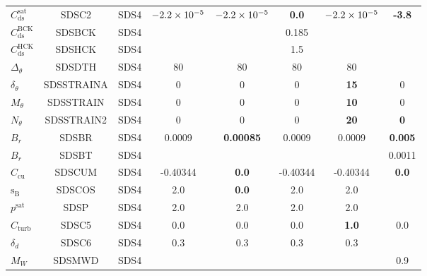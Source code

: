 \begin{landscape}
\begin{table}
\begin{center}
\begin{tabular}{|l|c|c|c|c|c|c|c|}
  $C_{\mathrm{ds}}^{\mathrm{sat}}$ & SDSC2         & SDS4      &$-2.2\times 10^{-5}$&$-2.2\times 10^{-5}$     &\textbf{0.0}  &$-2.2\times 10^{-5}$&  \textbf{-3.8}  \\
  $C_{\mathrm{ds}}^{\mathrm{BCK}}$ & SDSBCK        & SDS4      &            &                   & 0.185        &             & \\
  $C_{\mathrm{ds}}^{\mathrm{HCK}}$ & SDSHCK        & SDS4      &            &                   &  1.5         &             & \\
  $\Delta_\theta$                  & SDSDTH        & SDS4      & 80          & 80               & 80           &  80         & \\
  $\delta_\theta$                  & SDSSTRAINA    & SDS4      & 0           & 0                & 0            & \textbf{15} &  0  \\
  $M_\theta$                       & SDSSTRAIN     & SDS4      & 0           & 0                & 0            & \textbf{10} &  0  \\
  $N_\theta$                       & SDSSTRAIN2    & SDS4      & 0           & 0                & 0            & \textbf{20} &  \textbf{0}   \\
  $B_r$                            & SDSBR         & SDS4      & 0.0009      &\textbf{0.00085}  & 0.0009       & 0.0009      &  \textbf{0.005}  \\
  $B_r$                            & SDSBT         & SDS4      &             &                  &              &             &    0.0011     \\
  $C_{\mathrm{cu}}$                & SDSCUM        & SDS4      & -0.40344    & \textbf{0.0}     &-0.40344      &-0.40344     & \textbf{0.0} \\
  ${\mathrm{s_B}}$                 & SDSCOS        &SDS4       & 2.0         & \textbf{0.0}     & 2.0          & 2.0         &     \\
  $p^{\mathrm{sat}}$               & SDSP          & SDS4      & 2.0         & 2.0              & 2.0          & 2.0         &     \\
  $C_{\mathrm{turb}}$              & SDSC5         & SDS4      & 0.0         &  0.0             & 0.0          & \textbf{1.0}& 0.0 \\
  $\delta_d$                       & SDSC6         & SDS4      & 0.3         &  0.3             & 0.3          &0.3          & \\
  $ M_W$			   & SDSMWD	   & SDS4      &            &                   &              &             & 0.9 \\

\end{tabular}
\end{center}
\end{table}
\end{landscape}
